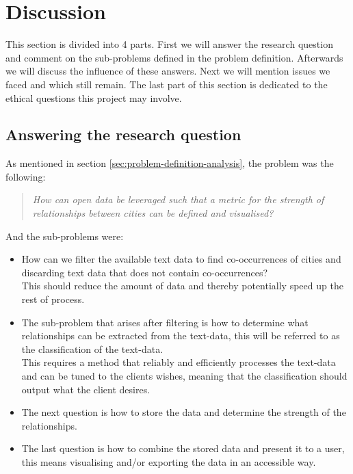 \chapter{Discussion}

This section is divided into 4 parts. First we will answer the research question and comment on the sub-problems defined in the problem definition. Afterwards we will discuss the influence of these answers. Next we will mention issues we faced and which still remain. The last part of this section is dedicated to the ethical questions this project may involve.


\section{Answering the research question}

\todo{}

As mentioned in section \ref{sec:problem-definition-analysis}, the problem was the following:
\begin{quote} 
\centering 
\textit{How can open data be leveraged such that a metric for the strength of relationships between cities can be defined and visualised?}
\end{quote}

And the sub-problems were:
\begin{itemize}
    \item How can we filter the available text data to find co-occurrences of cities and discarding text data that does not contain co-occurrences? \\
    
    This should reduce the amount of data and thereby potentially speed up the rest of process.
    \item The sub-problem that arises after filtering is how to determine what relationships can be extracted from the text-data, this will be referred to as the classification of the text-data. \\
    
    This requires a method that reliably and efficiently processes the text-data and can be tuned to the clients wishes, meaning that the classification should output what the client desires. 
    \item The next question is how to store the data and determine the strength of the relationships. 
    \item The last question is how to combine the stored data and present it to a user, this means visualising and/or exporting the data in an accessible way.
\end{itemize}

